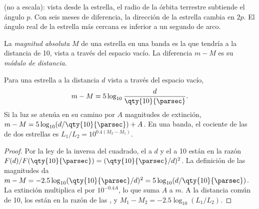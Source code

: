 \begin{omfigure}

{\small {} (no a escala): vista desde la estrella, el radio de la órbita
terrestre subtiende el ángulo $p$. Con seis meses de diferencia, la dirección de la
estrella cambia en $2p$. El ángulo real de la estrella más cercana es inferior a un
segundo de arco.}
\end{omfigure}

\begin{definition}\label{def:b1:observing-the-sky:absolute}
La \emph{magnitud absoluta} $M$ de una estrella en una banda es
la  que tendría a la distancia de \qty{10}{\parsec}, vista a través del
espacio vacío. La diferencia $m - M$ es su
\emph{módulo de distancia}.
\end{definition}

\begin{proposition}\label{prop:b1:observing-the-sky:modulus}
Para una estrella a la distancia $d$ vista a través del espacio vacío,
\[
  m - M = 5\log_{10}\frac{d}{\qty{10}{\parsec}} .
\]
Si la luz se atenúa en su camino por $A$ magnitudes de extinción,
$m - M = 5\log_{10}(d/\qty{10}{\parsec}) + A$. En una banda, el cociente de las
 de dos estrellas es $L_1/L_2 = 10^{0.4(M_2 - M_1)}$.
\end{proposition}

\begin{proof}
Por la ley de la inversa del cuadrado, el  a $d$ y el  a \qty{10}{\parsec}
están en la razón $F(d)/F(\qty{10}{\parsec}) = (\qty{10}{\parsec}/d)^2$. La definición de
las magnitudes da $m - M = -2.5\log_{10}(\qty{10}{\parsec}/d)^2
= 5\log_{10}(d/\qty{10}{\parsec})$. La extinción multiplica el  por
$10^{-0.4A}$, lo que suma $A$ a $m$. A la distancia común de
\qty{10}{\parsec}, los  están en la razón de las , y
$M_1 - M_2 = -2.5\log_{10}(L_1/L_2)$.
\end{proof}

